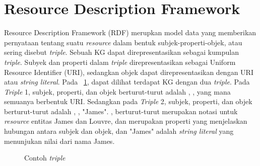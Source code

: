 \section{Resource Description Framework}
\label{sec:resource-description-framework}

Resource Description Framework (RDF) merupkan model data yang memberikan pernyataan tentang suatu
\textit{resource} dalam bentuk subjek-properti-objek, atau sering disebut \textit{triple}. Sebuah KG
dapat direpresentasikan sebagai kumpulan \textit{triple}. Subyek dan properti dalam \textit{triple}
direpresentasikan sebagai Uniform Resource Identifier (URI), sedangkan objek dapat direpresentasikan
dengan URI atau \textit{string literal}. Pada \pic~\ref{fig:triple-example}, dapat dilihat terdapat
KG dengan dua \textit{triple}. Pada \textit{Triple} 1, subjek, properti, dan objek berturut-turut
adalah , ,
 yang mana semuanya berbentuk URI. Sedangkan pada \textit{Triple}
2, subjek, properti, dan objek berturut-turut adalah ,
, "James". ,
 berturut-turut merupakan notasi untuk \textit{resource} entitas
James dan Louvre,  dan 
merupakan properti yang menjelaskan hubungan antara subjek dan objek, dan "James" adalah
\textit{string literal} yang menunjukan nilai dari nama James.

\begin{figure}
  \centering
  \caption{Contoh \textit{triple}}
  \label{fig:triple-example}
\end{figure}



